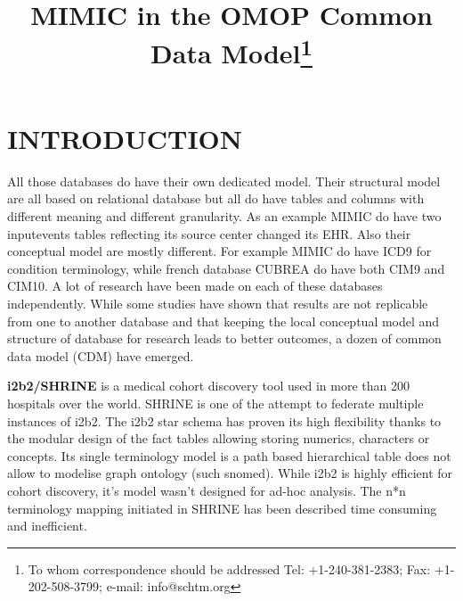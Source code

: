 \documentclass{aes2e}
\begin{document}


\title{MIMIC in the OMOP Common Data Model\thanks{To whom correspondence should be addressed Tel: +1-240-381-2383; Fax: +1-202-508-3799; e-mail: info@schtm.org}}




\maketitle

\section{INTRODUCTION}
All those databases do have their own dedicated model. Their structural model
are all based on relational database but all do have tables and columns with
different meaning and different granularity. As an example MIMIC do have two
inputevents tables reflecting its source center changed its EHR. Also their
conceptual model are mostly different. For example MIMIC do have ICD9 for
condition terminology, while french database CUBREA do have both CIM9 and
CIM10. A lot of research have been made on each of these databases
independently. While some studies have shown that results are not replicable
from one to another database \cite{omop-replicability} and that keeping the
local conceptual model \cite{fhir-deep} and structure \cite{imi-protect} of
database for research leads to better outcomes, a dozen of common data model
(CDM) have emerged.

\textbf{i2b2/SHRINE} is a medical cohort discovery tool used in more than 200 hospitals over the world. SHRINE is one of the attempt to federate multiple instances of i2b2. The i2b2 star schema has proven its high flexibility thanks to the modular design of the fact tables allowing storing numerics, characters or concepts. Its single terminology model is a path based hierarchical table does not allow to modelise graph ontology (such snomed). While i2b2 is highly efficient for cohort discovery, it's model wasn't designed for ad-hoc analysis. The n*n terminology mapping initiated in SHRINE has been described time consuming and inefficient.
	
\end{document}

